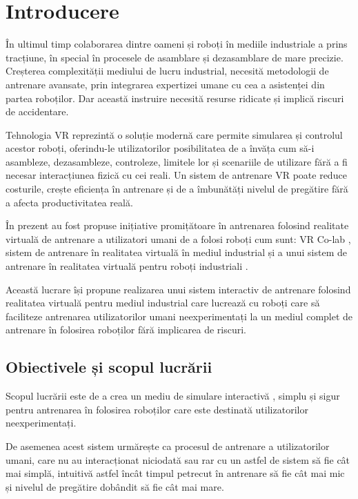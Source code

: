 \clearpage




\setcounter{page}{4}
\section{Introducere}
În ultimul timp colaborarea dintre oameni și roboți în mediile industriale a prins tracțiune, în special în procesele de asamblare și dezasamblare de mare precizie. Creșterea complexității mediului de lucru industrial, necesită metodologii de antrenare avansate, prin integrarea expertizei umane cu cea a asistenței din partea roboților. Dar această instruire necesită resurse ridicate și implică riscuri de accidentare.

Tehnologia VR reprezintă o soluție modernă care permite simularea și controlul acestor roboți, oferindu-le utilizatorilor posibilitatea de a învăța cum să-i asambleze, dezasambleze, controleze, limitele lor și scenariile de utilizare fără a fi necesar interacțiunea fizică cu cei reali. Un sistem de antrenare VR poate reduce costurile, crește eficiența în antrenare și de a îmbunătăți nivelul de pregătire fără a afecta productivitatea reală.

În prezent au fost propuse inițiative promițătoare în antrenarea folosind  realitate virtuală de antrenare a utilizatori umani de a folosi roboți cum sunt: VR Co-lab \cite{ref1}, sistem de antrenare în realitatea virtuală în mediul industrial \cite{ref2} și a unui sistem de antrenare în realitatea virtuală pentru roboți industriali \cite{ref3}.

Această lucrare își propune realizarea unui sistem interactiv de antrenare folosind realitatea virtuală pentru mediul industrial care lucrează cu roboți care să faciliteze antrenarea utilizatorilor umani neexperimentați la un mediul complet de antrenare în folosirea roboților fără implicarea de riscuri.

\subsection{Obiectivele și scopul lucrării}
Scopul lucrării este de a crea un mediu de simulare interactivă , simplu și sigur pentru antrenarea în folosirea roboților care este destinată utilizatorilor neexperimentați.

De asemenea acest sistem urmărește ca procesul de antrenare a utilizatorilor umani, care nu au interacționat niciodată sau rar cu un astfel de sistem să fie cât mai simplă, intuitivă astfel încât timpul petrecut în antrenare să fie cât mai mic și nivelul de pregătire dobândit să fie cât mai mare.

